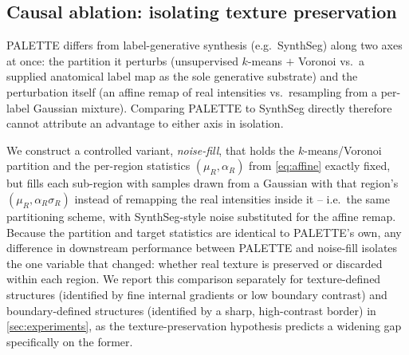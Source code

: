 \subsection{Causal ablation: isolating texture preservation}
\label{subsec:m-ablation}

PALETTE differs from label-generative synthesis (e.g.\ SynthSeg) along two
axes at once: the partition it perturbs (unsupervised $k$-means $+$ Voronoi
vs.\ a supplied anatomical label map as the sole generative substrate) and
the perturbation itself (an affine remap of real intensities vs.\
resampling from a per-label Gaussian mixture). Comparing PALETTE to
SynthSeg directly therefore cannot attribute an advantage to either axis in
isolation.

We construct a controlled variant, \emph{noise-fill}, that holds the
$k$-means/Voronoi partition and the per-region statistics $(\mu_R,
\alpha_R)$ from \cref{eq:affine} exactly fixed, but fills each sub-region
with samples drawn from a Gaussian with that region's $(\mu_R, \alpha_R
\sigma_R)$ instead of remapping the real intensities inside it -- i.e.\ the
same partitioning scheme, with SynthSeg-style noise substituted for the
affine remap. Because the partition and target statistics are identical to
PALETTE's own, any difference in downstream performance between PALETTE and
noise-fill isolates the one variable that changed: whether real texture is
preserved or discarded within each region. We report this comparison
separately for texture-defined structures (identified by fine internal
gradients or low boundary contrast) and boundary-defined structures
(identified by a sharp, high-contrast border) in \cref{sec:experiments}, as
the texture-preservation hypothesis predicts a widening gap specifically on
the former.
